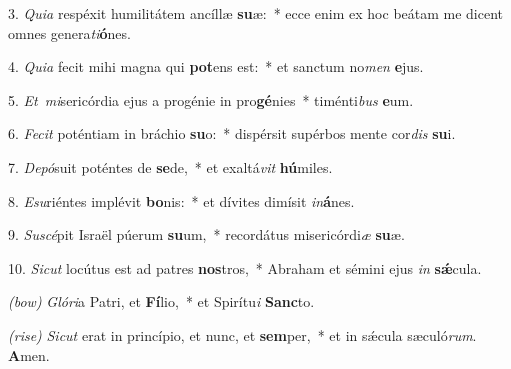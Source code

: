 3. \textit{Quia} respéxit humilitátem ancíllæ \textbf{su}æ:~*
	ecce enim ex hoc beátam me dicent omnes genera\textit{ti}\textbf{ó}nes.

4. \textit{Quia} fecit mihi magna qui \textbf{pot}ens est:~*
	et sanctum no\textit{men} \textbf{e}jus.

5. \textit{Et\ mi}sericórdia ejus a progénie in pro\textbf{gé}nies~*
	timénti\textit{bus} \textbf{e}um.

6. \textit{Fecit} poténtiam in bráchio \textbf{su}o:~*
	dispérsit supérbos mente cor\textit{dis} \textbf{su}i.

7. \textit{Depó}suit poténtes de \textbf{se}de,~*
	et exaltá\textit{vit} \textbf{hú}miles.

8. \textit{Esu}riéntes implévit \textbf{bo}nis:~*
	et dívites dimísit \textit{in}\textbf{á}nes.

9. \textit{Suscé}pit Israël púerum \textbf{su}um,~*
	recordátus misericórdi\textit{æ} \textbf{su}æ.

10. \textit{Sicut} locútus est ad patres \textbf{nos}tros,~*
	Abraham et sémini ejus \textit{in} \textbf{s\'{\ae}}cula.

{\color{red}\textit{(bow)}} \textit{Glóri}a Patri, et \textbf{Fí}lio,~*
	et Spirítu\textit{i} \textbf{Sanc}to.

{\color{red}\textit{(rise)}} \textit{Sicut} erat in princípio, et nunc, et \textbf{sem}per,~*
	et in s\'{\ae}cula sæculó\textit{rum}. \textbf{A}men.